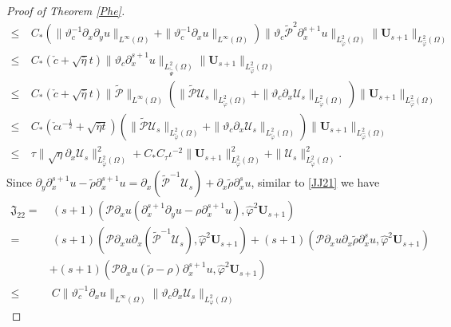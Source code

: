 \documentclass{amsart}
\numberwithin{equation}{section}
\begin{document}
\begin{proof}[Proof of Theorem \ref{Phe}]
\begin{align}
\leq&~C_{*}\left(\|\vartheta_{c}^{-1}\partial_{x}\partial_{y}u\|_{L^{\infty}(\Omega)}+\|\vartheta_{c}^{-1}\partial_{x}u\|_{L^{\infty}(\Omega)}\right)
      \|\vartheta_{c}\tilde{\mathcal{P}}^{2}\partial_{x}^{s+1}u\|_{L_{\tilde{\varphi}}^{2}(\Omega)}\|\mathbf{U}_{s+1}\|_{L_{\hat{\varphi}}^{2}(\Omega)}\nonumber\\
\leq&~C_{*}(\check{c}+\sqrt{\bar{\eta}}t)
      \|\vartheta_{c}\partial_{x}^{s+1}u\|_{L_{\tilde{\hat{\Psi}}}^{2}(\Omega)}\|\mathbf{U}_{s+1}\|_{L_{\hat{\varphi}}^{2}(\Omega)}\nonumber\\
\leq&~C_{*}(\check{c}+\sqrt{\bar{\eta}}t)\|\tilde{\mathcal{P}}\|_{L^{\infty}(\Omega)}
      \left(\|\tilde{\mathcal{P}}\mathcal{U}_{s}\|_{L_{\tilde{\varphi}}^{2}(\Omega)}+\|\vartheta_{c}\partial_{x}\mathcal{U}_{s}\|_{L_{\tilde{\varphi}}^{2}(\Omega)}\right)
      \|\mathbf{U}_{s+1}\|_{L_{\hat{\varphi}}^{2}(\Omega)}\nonumber\\
\leq&~C_{*}(\check{c}\iota^{-\frac{1}{2}}+\sqrt{\bar{\eta}t})
      \left(\|\tilde{\mathcal{P}}\mathcal{U}_{s}\|_{L_{\tilde{\varphi}}^{2}(\Omega)}+\|\vartheta_{c}\partial_{x}\mathcal{U}_{s}\|_{L_{\tilde{\varphi}}^{2}(\Omega)}\right)
      \|\mathbf{U}_{s+1}\|_{L_{\hat{\varphi}}^{2}(\Omega)}\nonumber\\
\leq&~\tau\|\sqrt{\eta}\partial_{x}\mathcal{U}_{s}\|_{L_{\tilde{\varphi}}^{2}(\Omega)}^{2}
     +C_{*}C_{\tau}\iota^{-2}\|\mathbf{U}_{s+1}\|_{L_{\hat{\varphi}}^{2}(\Omega)}^{2}
     +\|\mathcal{U}_{s}\|_{L_{\tilde{\varphi}}^{2}(\Omega)}^{2}.\nonumber
\end{align}
Since $\partial_{y}\partial_{x}^{s+1}u-\tilde{\rho}\partial_{x}^{s+1}u=\partial_{x}(\tilde{\mathcal{P}}^{-1}\mathcal{U}_{s})+\partial_{x}\tilde{\rho}\partial_{x}^{s}u$,
similar to \eqref{JJ21} we have
\begin{align}\label{JJ22}
\mathfrak{J}_{22}
=&~(s+1)(\mathcal{P}\partial_{x}u(\partial_{x}^{s+1}\partial_{y}u-\rho\partial_{x}^{s+1}u),\hat{\varphi}^{2}\mathbf{U}_{s+1})\\
=&~(s+1)(\mathcal{P}\partial_{x}u\partial_{x}(\tilde{\mathcal{P}}^{-1}\mathcal{U}_{s}),\hat{\varphi}^{2}\mathbf{U}_{s+1})
  +(s+1)(\mathcal{P}\partial_{x}u\partial_{x}\tilde{\rho}\partial_{x}^{s}u,\hat{\varphi}^{2}\mathbf{U}_{s+1})\nonumber\\
 &+(s+1)(\mathcal{P}\partial_{x}u(\tilde{\rho}-\rho)\partial_{x}^{s+1}u,\hat{\varphi}^{2}\mathbf{U}_{s+1})\nonumber\\
\leq&~C\|\vartheta_{c}^{-1}\partial_{x}u\|_{L^{\infty}(\Omega)}
       \|\vartheta_{c}\partial_{x}\mathcal{U}_{s}\|_{L_{\varphi}^{2}(\Omega)}

\end{align}
\end{proof}
\end{document}
